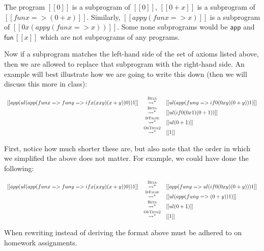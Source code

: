 \documentclass{article}
\begin{document}
The program $[[0]]$ is a subprogram of $[[0]]$, $[[0 + x]]$ is a
subprogram of $[[fun x => (0 + x)]]$.  Similarly, $[[app y (fun x =>
    x)]]$ is a subprogram of $[[0 x (app y (fun x => x))]]$.   Some
none subprograms would be $\mathsf{app}$ and $\mathsf{fun}\,[[x]]$
which are not subprograms of any programs.

Now if a subprogram matches the left-hand side of the set of axioms
listed above, then we are allowed to replace that subprogram with the
right-hand side.  An example will best illustrate how we are going to
write this down (then we will discuss this more in class):
\begin{center}
  \begin{math}
    \begin{array}{rcl}
      [[app (ul(app (fun x => fun y => if x (x x y) (x + y)) 0)) 1]]
      & \stackrel{\textsc{Beta}}{\rightsquigarrow^*} & 
      [[ul(app (fun y => if 0 (0 x y) (0 + y)) 1)]]\\
      & \stackrel{\textsc{Beta}}{\rightsquigarrow^*} & 
      [[ul(if 0 (0 x 1) (0 + 1))]]\\
      & \stackrel{\textsc{IfFalse}}{\rightsquigarrow^*} & 
      [[ul(0 + 1)]]\\
      & \stackrel{\textsc{OrTrue2}}{\rightsquigarrow^*} & 
      [[1]]
    \end{array}
  \end{math}
\end{center}
First, notice how much shorter these are, but also note that the order
in which we simplified the above does not matter.  For example, we
could have done the following:
\begin{center}
  \begin{math}
    \begin{array}{rcl}
      [[app (ul(app (fun x => fun y => if x (x x y) (x + y)) 0)) 1]]
      & \stackrel{\textsc{Beta}}{\rightsquigarrow^*} & 
      [[app (fun y => ul(if 0 (0 x y) (0 + y))) 1]]\\
      & \stackrel{\textsc{IfFalse}}{\rightsquigarrow^*} & 
      [[ul(app (fun y => (0 + y)) 1)]]\\
      & \stackrel{\textsc{Beta}}{\rightsquigarrow^*} & 
      [[ul(0 + 1)]]\\
      & \stackrel{\textsc{OrTrue2}}{\rightsquigarrow^*} & 
      [[1]]\\      
    \end{array}
  \end{math}
\end{center}
When rewriting instead of deriving the format above must be adhered
to on homework assignments.




\end{document}
